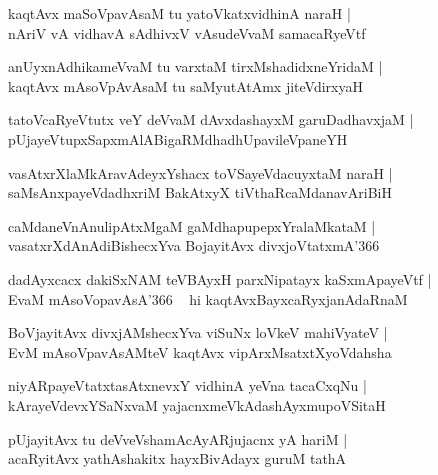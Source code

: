 \documentclass[twoside,12pt,openright]{book}
\newcounter{shloka}[chapter]
\begin{document}
\begin{shloka}%
kaqtAvx maSoVpavAsaM tu yatoVkatxvidhinA naraH |\\
nAriV vA vidhavA sAdhivxV vAsudeVvaM samacaRyeVtf 
\end{shloka}

\begin{shloka}%
anUyxnAdhikameVvaM tu varxtaM tirxMshadidxneYridaM |\\
kaqtAvx mAsoVpAvAsaM tu saMyutAtAmx jiteVdirxyaH 
\end{shloka}

\begin{shloka}%
tatoVcaRyeVtutx veY deVvaM dAvxdashayxM garuDadhavxjaM |\\
pUjayeVtupxSapxmAlABigaRMdhadhUpavileVpaneYH 
\end{shloka}

\begin{shloka}%
vasAtxrXlaMkAravAdeyxYshacx toVSayeVdacuyxtaM naraH |\\
saMsAnxpayeVdadhxriM BakAtxyX tiVthaRcaMdanavAriBiH 
\end{shloka}

\begin{shloka}%
caMdaneVnAnulipAtxMgaM gaMdhapupepxYralaMkataM |\\
vasatxrXdAnAdiBishecxYva BojayitAvx divxjoVtatxmA\char'366
\end{shloka}

\begin{shloka}%
dadAyxcacx dakiSxNAM teVBAyxH parxNipatayx kaSxmApayeVtf |\\
EvaM mAsoVopavAsA\char'366 ~ hi kaqtAvxBayxcaRyxjanAdaRnaM 
\end{shloka}

\begin{shloka}%
BoVjayitAvx divxjAMshecxYva viSuNx loVkeV mahiVyateV |\\
EvM mAsoVpavAsAMteV kaqtAvx vipArxMsatxtXyoVdahsha
\end{shloka}

\begin{shloka}%
niyARpayeVtatxtasAtxnevxY vidhinA yeVna tacaCxqNu |\\
kArayeVdevxYSaNxvaM yajacnxmeVkAdashAyxmupoVSitaH 
\end{shloka}

\begin{shloka}%
pUjayitAvx tu deVveVshamAcAyARjujacnx yA hariM |\\
acaRyitAvx yathAshakitx hayxBivAdayx guruM tathA 
\end{shloka}
\end{document}
